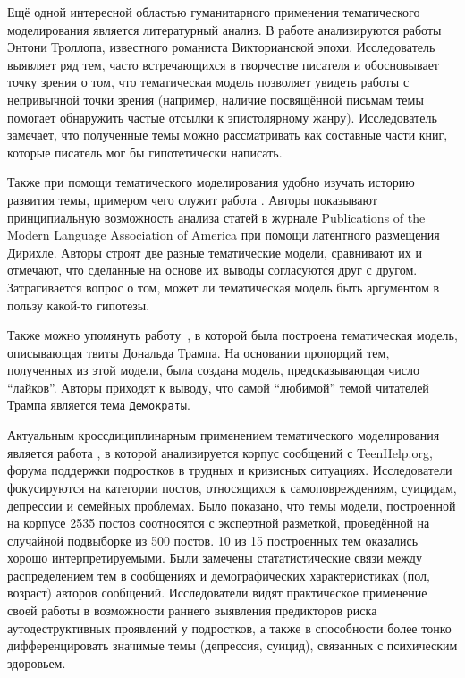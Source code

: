 Ещё одной интересной областью гуманитарного применения тематического моделирования является литературный анализ. В работе \cite{buurma2015fictionality} анализируются работы Энтони Троллопа, известного романиста Викторианской эпохи. Исследователь выявляет ряд тем, часто встречающихся в творчестве писателя и обосновывает точку зрения о том, что тематическая модель позволяет увидеть работы с непривычной точки зрения (например, наличие посвящённой письмам темы помогает обнаружить частые отсылки к эпистолярному жанру). Исследователь замечает, что полученные темы можно рассматривать как составные части книг, которые писатель мог бы гипотетически написать.

Также при помощи тематического моделирования удобно изучать историю развития темы, примером чего служит работа \cite{goldstone2012can}. Авторы показывают принципиальную возможность анализа статей в журнале Publications of the Modern Language Association of America при помощи латентного размещения Дирихле. Авторы строят две разные тематические модели, сравнивают их и отмечают, что сделанные на основе их выводы согласуются друг с другом. Затрагивается вопрос о том, может ли тематическая модель быть аргументом в пользу какой-то гипотезы.

Также можно упомянуть работу~\cite{wang2016catching}, в которой была построена тематическая модель, описывающая твиты Дональда Трампа. На основании пропорций тем, полученных из этой модели, была создана модель, предсказывающая число ``лайков''. Авторы приходят к выводу, что самой ``любимой'' темой читателей Трампа является тема \texttt{Демократы}.

Актуальным кроссдициплинарным применением тематического моделирования является работа \cite{franz2020using}, в которой анализируется корпус сообщений с TeenHelp.org, форума  поддержки подростков в трудных и кризисных ситуациях. Исследователи фокусируются на категории постов, относящихся к самоповреждениям, суицидам, депрессии и семейных проблемах. Было показано, что темы модели, построенной на корпусе 2535 постов соотносятся с экспертной разметкой, проведённой на случайной подвыборке из 500 постов. 10 из 15 построенных тем оказались хорошо интерпретируемыми. Были замечены стататистические связи между распределением тем в сообщениях и демографических характеристиках (пол, возраст) авторов сообщений. 
Исследователи видят практическое применение своей работы в возможности раннего выявления предикторов риска аутодеструктивных проявлений у подростков, а также в способности более тонко дифференцировать значимые темы (депрессия, суицид), связанных с психическим здоровьем. 



